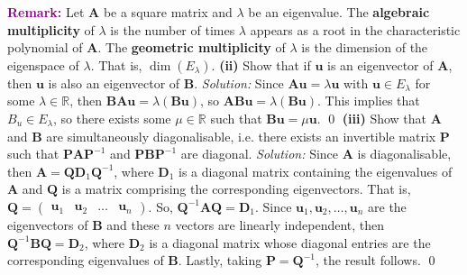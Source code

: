 \documentclass{article}
\begin{document}
\newline
\newline\textbf{\textcolor{purple}{Remark:}} Let $\mathbf{A}$ be a square matrix and $\lambda$ be an eigenvalue. The \textbf{algebraic multiplicity} of $\lambda$ is the number of times $\lambda$ appears as a root in the characteristic polynomial of $\mathbf{A}$. The \textbf{geometric multiplicity} of $\lambda$ is the dimension of the eigenspace of $\lambda$. That is, $\operatorname{dim}(E_\lambda)$.
\newline
\newline\textbf{(ii)} Show that if $\mathbf{u}$ is an eigenvector of $\mathbf{A}$, then $\mathbf{u}$ is also an eigenvector of $\mathbf{B}$.
\newline
\newline\textit{Solution:} Since $\mathbf{Au}=\lambda\mathbf{u}$ with $\mathbf{u}\in E_\lambda$ for some $\lambda\in\mathbb{R}$, then $\mathbf{BAu}=\lambda(\mathbf{Bu})$, so $\mathbf{ABu}=\lambda(\mathbf{Bu})$. This implies that $B_u\in E_\lambda$, so there exists some $\mu\in\mathbb{R}$ such that $\mathbf{Bu}=\mu\mathbf{u}$. \qed
\newline
\newline\textbf{(iii)} Show that $\mathbf{A}$ and $\mathbf{B}$ are simultaneously diagonalisable, i.e. there exists an invertible matrix $\mathbf{P}$ such
that $\mathbf{PAP}^{-1}$ and $\mathbf{PBP}^{-1}$ are diagonal.
\newline
\newline\textit{Solution:} Since $\mathbf{A}$ is diagonalisable, then $\mathbf{A}=\mathbf{Q}\mathbf{D}_1\mathbf{Q}^{-1}$, where $\mathbf{D}_1$ is a diagonal matrix containing the eigenvalues of $\mathbf{A}$ and $\mathbf{Q}$ is a matrix comprising the corresponding eigenvectors. That is, $\mathbf{Q}=\begin{pmatrix}
\mathbf{u}_1&\mathbf{u}_2&\hdots&\mathbf{u}_n
\end{pmatrix}$. So,  $\mathbf{Q}^{-1}\mathbf{AQ}=\mathbf{D}_1$. Since $\mathbf{u}_1,\mathbf{u}_2,\hdots,\mathbf{u}_n$ are the eigenvectors of $\mathbf{B}$ and these $n$ vectors are linearly independent, then $\mathbf{Q}^{-1}\mathbf{BQ}=\mathbf{D}_2$, where $\mathbf{D}_2$ is a diagonal matrix whose diagonal entries are the corresponding eigenvalues of $\mathbf{B}$. Lastly, taking $\mathbf{P}=\mathbf{Q}^{-1}$, the result follows. \qed 
\end{document}
